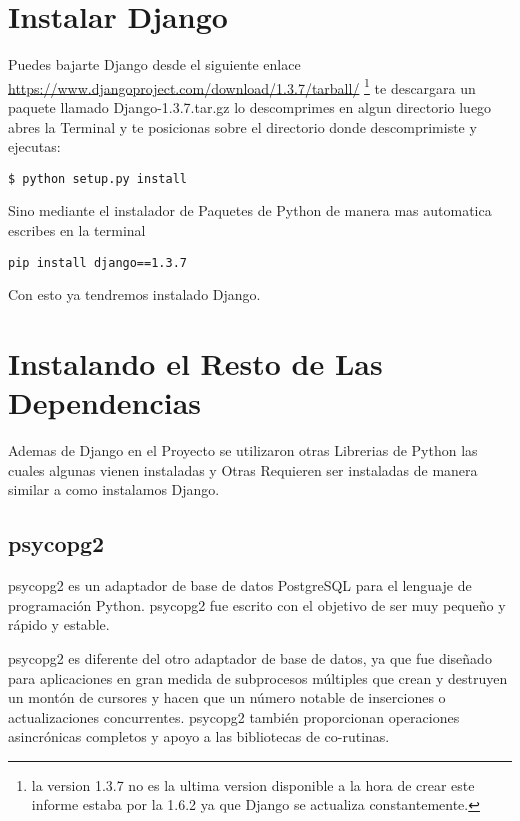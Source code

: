 \section{Instalar Django}

Puedes bajarte Django desde el siguiente enlace \url{https://www.djangoproject.com/download/1.3.7/tarball/}
\footnote {la version 1.3.7 no es la ultima version disponible a la hora de crear
este informe estaba por la 1.6.2 ya que Django se actualiza constantemente.}
te descargara un paquete llamado Django-1.3.7.tar.gz lo descomprimes en
algun directorio luego abres la Terminal y te posicionas sobre el directorio
donde descomprimiste y ejecutas:

\begin{lstlisting}[style=consola]
    $ python setup.py install 
\end{lstlisting}
\vspace{0.1cm}

Sino mediante el instalador de Paquetes de Python de manera mas automatica escribes
en la terminal

\begin{lstlisting}[style=consola]
     pip install django==1.3.7
\end{lstlisting}
\vspace{0.1cm}

Con esto ya tendremos instalado Django.

\section{Instalando el Resto de Las Dependencias}

Ademas de Django en el Proyecto se utilizaron otras Librerias de Python las cuales
algunas vienen instaladas y Otras Requieren ser instaladas de manera similar
a como instalamos Django.

\subsection{psycopg2}

psycopg2 es un adaptador de base de datos PostgreSQL para el lenguaje de
programación Python. psycopg2 fue escrito con el objetivo de ser muy pequeño
y rápido y estable. 

psycopg2 es diferente del otro adaptador de base de datos, ya que fue diseñado
para aplicaciones en gran medida de subprocesos múltiples que crean y destruyen
un montón de cursores y hacen que un número notable de inserciones o
actualizaciones concurrentes. psycopg2 también proporcionan operaciones
asincrónicas completos y apoyo a las bibliotecas de co-rutinas. 

